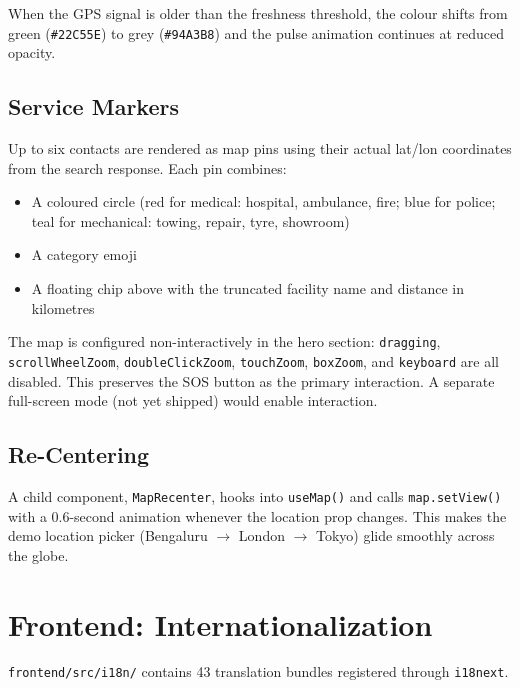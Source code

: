\documentclass[11pt, a4paper]{article}
\newcommand{\file}[1]{\texttt{\small\color{rsblue}#1}}
\newcommand{\code}[1]{\texttt{\small#1}}
\begin{document}
When the GPS signal is older than the freshness threshold, the colour shifts from green (\code{\#22C55E}) to grey (\code{\#94A3B8}) and the pulse animation continues at reduced opacity.

\subsection{Service Markers}

Up to six contacts are rendered as map pins using their actual lat/lon coordinates from the search response. Each pin combines:

\begin{itemize}[leftmargin=*, itemsep=2pt, topsep=2pt]
  \item A coloured circle (red for medical: hospital, ambulance, fire; blue for police; teal for mechanical: towing, repair, tyre, showroom)
  \item A category emoji
  \item A floating chip above with the truncated facility name and distance in kilometres
\end{itemize}

The map is configured non-interactively in the hero section: \code{dragging}, \code{scrollWheelZoom}, \code{doubleClickZoom}, \code{touchZoom}, \code{boxZoom}, and \code{keyboard} are all disabled. This preserves the SOS button as the primary interaction. A separate full-screen mode (not yet shipped) would enable interaction.

\subsection{Re-Centering}

A child component, \code{MapRecenter}, hooks into \code{useMap()} and calls \code{map.setView()} with a 0.6-second animation whenever the location prop changes. This makes the demo location picker (Bengaluru $\rightarrow$ London $\rightarrow$ Tokyo) glide smoothly across the globe.

\section{Frontend: Internationalization}

\file{frontend/src/i18n/} contains 43 translation bundles registered through \code{i18next}.
\end{document}
